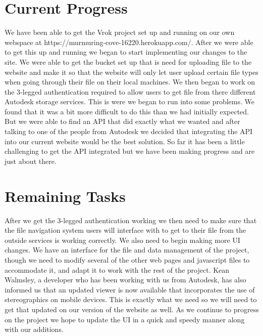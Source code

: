 \documentclass[10pt,draftclsnofoot,onecolumn]{IEEEtran}
\begin{document}
\section{Current Progress}
We have been able to get the Vrok project set up and running on our own webspace at https://murmuring-cove-16220.herokuapp.com/. After we were able to get this up and running we began to start implementing our changes to the site. We were able to get the bucket set up that is need for uploading file to the website and make it so that the website will only let user upload certain file types when going through their file on their local machines. We then began to work on the 3-legged authentication required to allow users to get file from there different Autodesk storage services. This is were we began to run into some problems. We found that it was a bit more difficult to do this than we had initially expected. But we were able to find an API that did exactly what we wanted and after talking to one of the people from Autodesk we decided that integrating the API into our current website would be the best solution. So far it has been a little challenging to get the API integrated but we have been making progress and are just about there.



\section{Remaining Tasks}
After we get the 3-legged authentication working we then need to make sure that the file navigation system users will interface with to get to their file from the outside services is working correctly. We also need to begin making more UI changes. We have an interface for the file and data management of the project, though we need to modify several of the other web pages and javascript files to accommodate it, and adapt it to work with the rest of the project. Kean Walmsley, a developer who has been working with us from Autodesk, has also informed us that an updated viewer is now available that incorporates the use of stereographics on mobile devices. This is exactly what we need so we will need to get that updated on our version of the website as well. As we continue to progress on the project we hope to update the UI in a quick and speedy manner along with our additions.
\end{document}
